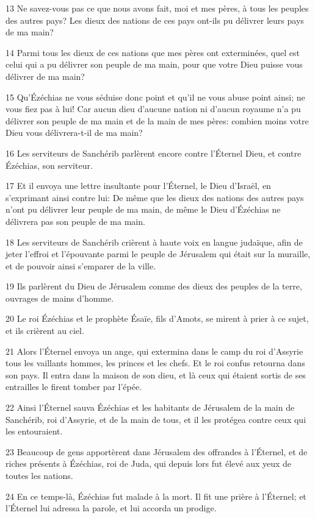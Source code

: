 \par 13 Ne savez-vous pas ce que nous avons fait, moi et mes pères, à tous les peuples des autres pays? Les dieux des nations de ces pays ont-ils pu délivrer leurs pays de ma main?
\par 14 Parmi tous les dieux de ces nations que mes pères ont exterminées, quel est celui qui a pu délivrer son peuple de ma main, pour que votre Dieu puisse vous délivrer de ma main?
\par 15 Qu'Ézéchias ne vous séduise donc point et qu'il ne vous abuse point ainsi; ne vous fiez pas à lui! Car aucun dieu d'aucune nation ni d'aucun royaume n'a pu délivrer son peuple de ma main et de la main de mes pères: combien moins votre Dieu vous délivrera-t-il de ma main?
\par 16 Les serviteurs de Sanchérib parlèrent encore contre l'Éternel Dieu, et contre Ézéchias, son serviteur.
\par 17 Et il envoya une lettre insultante pour l'Éternel, le Dieu d'Israël, en s'exprimant ainsi contre lui: De même que les dieux des nations des autres pays n'ont pu délivrer leur peuple de ma main, de même le Dieu d'Ézéchias ne délivrera pas son peuple de ma main.
\par 18 Les serviteurs de Sanchérib crièrent à haute voix en langue judaïque, afin de jeter l'effroi et l'épouvante parmi le peuple de Jérusalem qui était sur la muraille, et de pouvoir ainsi s'emparer de la ville.
\par 19 Ils parlèrent du Dieu de Jérusalem comme des dieux des peuples de la terre, ouvrages de mains d'homme.
\par 20 Le roi Ézéchias et le prophète Ésaïe, fils d'Amots, se mirent à prier à ce sujet, et ils crièrent au ciel.
\par 21 Alors l'Éternel envoya un ange, qui extermina dans le camp du roi d'Assyrie tous les vaillants hommes, les princes et les chefs. Et le roi confus retourna dans son pays. Il entra dans la maison de son dieu, et là ceux qui étaient sortis de ses entrailles le firent tomber par l'épée.
\par 22 Ainsi l'Éternel sauva Ézéchias et les habitants de Jérusalem de la main de Sanchérib, roi d'Assyrie, et de la main de tous, et il les protégea contre ceux qui les entouraient.
\par 23 Beaucoup de gens apportèrent dans Jérusalem des offrandes à l'Éternel, et de riches présents à Ézéchias, roi de Juda, qui depuis lors fut élevé aux yeux de toutes les nations.
\par 24 En ce temps-là, Ézéchias fut malade à la mort. Il fit une prière à l'Éternel; et l'Éternel lui adressa la parole, et lui accorda un prodige.

